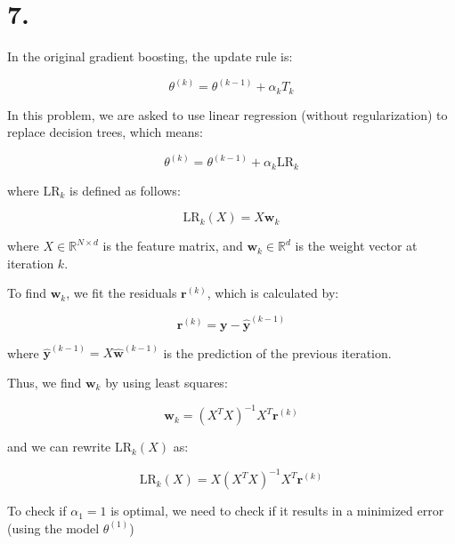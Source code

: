 \documentclass{article}
\begin{document}
\newpage

\section*{7.}

In the original gradient boosting, the update rule is:

\begin{equation*}
    \theta^{(k)} = \theta^{(k-1)} + \alpha_k T_k
\end{equation*}

In this problem, we are asked to use linear regression (without regularization) to replace decision trees, which means:

\begin{equation*}
    \theta^{(k)} = \theta^{(k-1)} + \alpha_k \mathrm{LR}_k
\end{equation*}

where $\mathrm{LR}_k$ is defined as follows:

\begin{equation*}
    \mathrm{LR}_k(X) = X \mathbf{w}_k
\end{equation*}

where $X \in \mathbb{R}^{N \times d}$ is the feature matrix, 
and $\mathbf{w}_k \in \mathbb{R}^d$ is the weight vector at iteration $k$.

To find $\mathbf{w}_k$, we fit the residuals $\mathbf{r}^{(k)}$, which is calculated by:

\begin{equation*}
    \mathbf{r}^{(k)} = \mathbf{y} - \hat{\mathbf{y}}^{(k-1)}
\end{equation*}

where $\hat{\mathbf{y}}^{(k-1)} = X \hat{\mathbf{w}}^{(k-1)}$ is the prediction of the previous iteration.

Thus, we find $\mathbf{w}_k$ by using least squares:

\begin{equation*}
    \mathbf{w}_k = (X^T X)^{-1} X^T \mathbf{r}^{(k)}
\end{equation*}

and we can rewrite $\mathrm{LR}_k(X)$ as:

\begin{equation*}
    \mathrm{LR}_k(X) = X (X^T X)^{-1} X^T \mathbf{r}^{(k)}
\end{equation*}

To check if $\alpha_1 = 1$ is optimal, we need to check if it results in a minimized error 
(using the model $\theta^{(1)}$)
\bigskip
\end{document}
